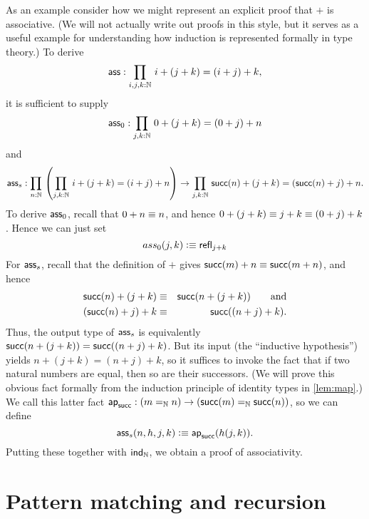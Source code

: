 As an example consider how we might represent an explicit proof that $+$ is associative.
(We will not actually write out proofs in this style, but it serves as a useful example for understanding how induction is represented formally in type theory.)
To derive
\[\ass : \prd{i,j,k:\nat} i + (j + k) = (i + j) + k, \]
it is sufficient to supply
\[ \ass_0 :  \prd{j,k:\nat} 0 + (j + k) = (0+ j) + n \]
and
\begin{equation*}
  \ass_s  : \prd{n:\nat} \left(\prd{j,k:\nat} i + (j + k) = (i + j) + n\right) 
   \to \prd{j,k:\nat} \suc(n) + (j + k) = (\suc(n) + j) + n.
\end{equation*}
To derive $\mathsf{ass}_0$, recall that $0+n \equiv n$, and hence  $0 + (j + k) \equiv j+k \equiv (0+ j) + k$.
Hence we can just set
\[ ass_0(j,k) \vcentcolon\equiv \mathsf{refl}_{j+k} \]
For $\mathsf{ass}_s$, recall that the definition of $+$ gives $\mathsf{succ}(m)+n \equiv \mathsf{succ}(m+n)$, and hence 
\begin{eqnarray*}
   \mathsf{succ}(n) + (j + k)  & \equiv & \mathsf{succ}(n+(j+k)) \qquad\text{and}\\
   (\mathsf{succ}(n)+j)+k & \equiv & \mathsf{succ}((n+j)+k).
\end{eqnarray*}
Thus, the output type of $\mathsf{ass}_s$ is equivalently $\mathsf{succ}(n+(j+k)) = \mathsf{succ}((n+j)+k)$.
But its input (the ``inductive hypothesis'') yields $n+(j+k)=(n+j)+k$, so it suffices to invoke the fact that if two natural numbers are equal, then so are their successors.
(We will prove this obvious fact formally from the induction principle of identity types in \autoref{lem:map}.)
We call this latter fact
$\apfunc{\suc} : %
(m =_\nat n) \to (\suc(m) =_\nat \suc(n))$, so we can define
\[\ass_s(n,h,j,k) \defeq \apfunc{\suc}( %
h(j,k)). \]
Putting these together with $\mathsf{ind}_{\mathbb{N}}$, we obtain a proof of associativity.


\section{Pattern matching and recursion}
\label{sec:pattern-matching}

